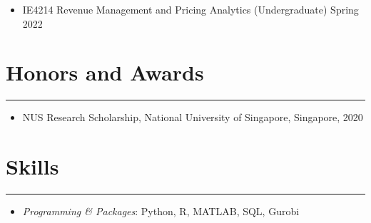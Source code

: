 \documentclass[12pt, a4paper]{article}
\begin{document}
{\begin{itemize}[leftmargin=36pt, itemsep=2pt, parsep=0pt, topsep=-0.5em]
	\item IE4214 Revenue Management and Pricing Analytics (Undergraduate) \hfill Spring 2022

\end{itemize}




\section*{Honors and Awards}
\vspace*{0.4em}
\hrule height 0.5pt
\begin{itemize}[leftmargin=36pt, itemsep=1pt, parsep=0.5pt, topsep=1pt]

	\item NUS Research Scholarship, National University of Singapore, Singapore, 2020
	



\end{itemize}




\section*{Skills}
\vspace*{0.4em}
\hrule height 0.5pt
\begin{itemize}[leftmargin=36pt, itemsep=2pt, parsep=0.2pt, topsep=1pt]

	\item {\it Programming \& Packages}: Python, R, MATLAB, SQL, Gurobi

\end{itemize}
}



\end{document}
